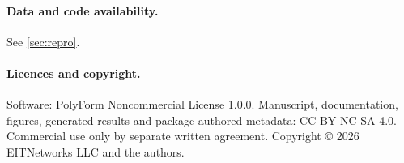 \paragraph{Data and code availability.} See \cref{sec:repro}.

\paragraph{Licences and copyright.}
Software: PolyForm Noncommercial License 1.0.0. Manuscript, documentation, figures, generated results and
package-authored metadata: CC BY-NC-SA 4.0. Commercial use only by separate written agreement. Copyright
\copyright{} 2026 EITNetworks LLC and the authors.
